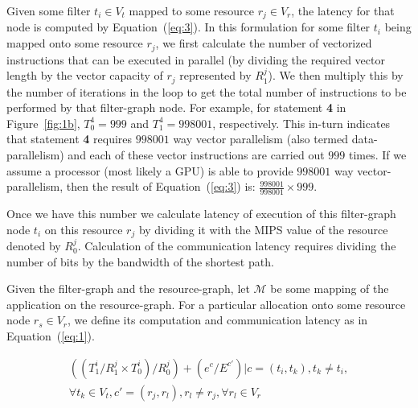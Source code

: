 \documentclass[10pt, conference, compsocconf]{IEEEtran}
\begin{document}
Given some filter $t_i \in V_t$ mapped to some resource $r_j \in V_r$,
the latency for that node is computed by Equation~(\ref{eq:3}). In this
formulation for some filter $t_i$ being mapped onto some resource $r_j$,
we first calculate the number of vectorized instructions that can be
executed in parallel (by dividing the required vector length by the
vector capacity of $r_j$ represented by $R^j_1$). We then multiply this
by the number of iterations in the loop to get the total number of
instructions to be performed by that filter-graph node. For example, for
statement \textbf{4} in Figure~\ref{fig:1b}, $T^4_0=999$ and
$T^4_1=998001$, respectively. This in-turn indicates that statement
\textbf{4} requires $998001$ way vector parallelism (also termed
data-parallelism) and each of these vector instructions are carried out
$999$ times. If we assume a processor (most likely a GPU) is able to
provide $998001$ way vector-parallelism, then the result of
Equation~(\ref{eq:3}) is: $\frac{998001}{998001}\times999$.

Once we have this number we calculate latency of execution of this
filter-graph node $t_i$ on this resource $r_j$ by dividing it with the
MIPS value of the resource denoted by $R^j_0$. Calculation of the
communication latency requires dividing the number of bits by the
bandwidth of the shortest path.

Given the filter-graph and the resource-graph, let $\mathcal{M}$ be some
mapping of the application on the resource-graph. For a particular
allocation onto some resource node $r_s \in V_r$, we define its
computation and communication latency as in Equation~(\ref{eq:1}).


\begin{scriptsize}
\begin{equation}
  \label{eq:3}
  \begin{array}{c}
    ((T^i_1/R^j_1\times T^i_0)/R^j_0)
    + (e^c/E^{c'}) | c = (t_i,t_k), t_k \neq t_i, \\ \forall t_k \in V_t, c' =
    (r_j,r_l), r_l \neq r_j, \forall r_l \in V_r
  \end{array}
\end{equation}
\end{scriptsize}
\end{document}
